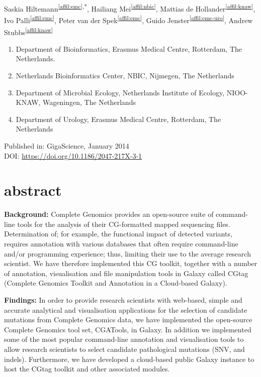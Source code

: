 \setcounter{NAT@ctr}{-1}

{}
Saskia Hiltemann\textsuperscript{\ref{affil:emc},*},
Hailiang Mei\textsuperscript{\ref{affil:nbic}},
Mattias de Hollander\textsuperscript{\ref{affil:knaw}},
Ivo Palli\textsuperscript{\ref{affil:emc}},
Peter van der Spek\textsuperscript{\ref{affil:emc}},
Guido Jenster\textsuperscript{\ref{affil:emc-uro}},
Andrew Stubbs\textsuperscript{\ref{affil:knaw}}

\small
\begin{enumerate}
\itemsep-0.5em
\item Department of Bioinformatics, Erasmus Medical Centre, Rotterdam, The Netherlands. \label{affil:emc}
\item Netherlands Bioinformatics Center, NBIC, Nijmegen, The Netherlands \label{affil:nbic}
\item Department of Microbial Ecology, Netherlands Institute of Ecology, NIOO-KNAW, Wageningen, The Netherlands \label{affil:knaw}
\item Department of Urology, Erasmus Medical Centre, Rotterdam,  The Netherlands \label{affil:emc-uro}
\end{enumerate}
\normalsize

Published in: GigaScience, January 2014 \\
DOI: \url{https://doi.org/10.1186/2047-217X-3-1}

\section*{abstract}

\textbf{Background:} Complete Genomics provides an open-source suite of command-line tools for the analysis of their CG-formatted mapped sequencing files. Determination of; for example, the functional impact of detected variants, requires annotation with various databases that often require command-line and/or programming experience; thus, limiting their use to the average research scientist. We have therefore implemented this CG toolkit, together with a number of annotation, visualisation and file manipulation tools in Galaxy called CGtag (Complete Genomics Toolkit and Annotation in a Cloud-based Galaxy).


\textbf{Findings:} In order to provide research scientists with web-based, simple and accurate analytical and visualisation applications for the selection of candidate mutations from Complete Genomics data, we have implemented the open-source Complete Genomics tool set, CGATools, in Galaxy. In addition we implemented some of the most popular command-line annotation and visualisation tools to allow research scientists to select candidate pathological mutations (SNV, and indels). Furthermore, we have developed a cloud-based public Galaxy instance to host the CGtag toolkit and other associated modules.

